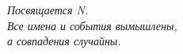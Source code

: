 \chapter*{}
\begin{flushright}
\vspace{2.0cm}
\textit{ \Large {
Посвящается N.}\\
{
\normalsize	
\vspace{\fill}
Все имена и события вымышлены,\\
а совпадения случайны.\\
}}
\end{flushright}
